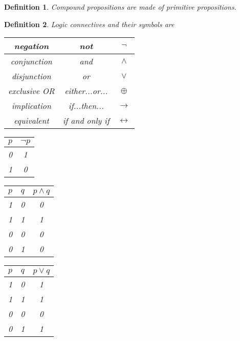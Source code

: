 \documentclass{article}
\newtheorem{definition}{Definition}
\begin{document}
\begin{definition}
	Compound propositions are made of primitive propositions.
\end{definition}

\begin{definition}
	Logic connectives and their symbols are
	\begin{center}
			\begin{tabular}{|c|c|c|}
			\hline 
			negation& not & $\neg$ \\ 
			\hline 
			conjunction& and & $\wedge$ \\ 
			\hline 
			disjunction& or & $\vee$ \\ 
			\hline 
			exclusive OR& either...or... & $\oplus$ \\ 
			\hline 
			implication& if...then... & $\to$ \\ 
			\hline 
			equivalent& if and only if  & $\leftrightarrow$ \\ 
			\hline 
		\end{tabular} 
	\end{center}
	
	\begin{tabular}{|c|c|}
		\hline 
		$p$ & $\neg p$ \\ 
		\hline 
		0 & 1 \\ 
		\hline 
		1 & 0 \\ 
		\hline 
	\end{tabular} 
	\quad
	\begin{tabular}{|c|c|c|}
		\hline 
		$p$& $q$ & $p\wedge q$ \\ 
		\hline 
		1 & 0 & 0 \\ 
		\hline 
		1 & 1 & 1 \\ 
		\hline 
		0 & 0 & 0 \\ 
		\hline 
		0 & 1 & 0 \\ 
		\hline
	\end{tabular} 
	\quad
	\begin{tabular}{|c|c|c|}
		\hline 
		$p$ & $q$ & $p\vee q$ \\ 
		\hline 
		1 & 0 & 1 \\ 
		\hline 
		1 & 1 & 1 \\ 
		\hline 
		0 & 0 & 0 \\ 
		\hline 
		0 & 1 & 1 \\ 
		\hline 
	\end{tabular}


\end{definition}
\end{document}
